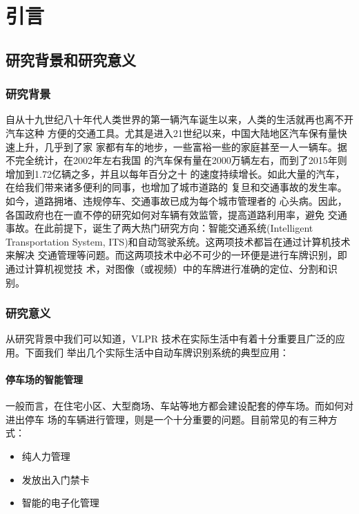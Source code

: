 \chapter{引言}
\section{研究背景和研究意义}
\subsection{研究背景}

自从十九世纪八十年代人类世界的第一辆汽车诞生以来，人类的生活就再也离不开汽车这种
方便的交通工具。尤其是进入21世纪以来，中国大陆地区汽车保有量快速上升，几乎到了家
家都有车的地步，一些富裕一些的家庭甚至一人一辆车。据不完全统计，在2002年左右我国
的汽车保有量在2000万辆左右，而到了2015年则增加到1.72亿辆之多，并且以每年百分之十
的速度持续增长。如此大量的汽车，在给我们带来诸多便利的同事，也增加了城市道路的
复旦和交通事故的发生率。如今，道路拥堵、违规停车、交通事故已成为每个城市管理者的
心头病。因此，各国政府也在一直不停的研究如何对车辆有效监管，提高道路利用率，避免
交通事故。在此前提下，诞生了两大热门研究方向：智能交通系统(Intelligent
Transportation System, ITS)和自动驾驶系统。这两项技术都旨在通过计算机技术来解决
交通管理等问题。而这两项技术中必不可少的一环便是进行车牌识别，即通过计算机视觉技
术，对图像（或视频）中的车牌进行准确的定位、分割和识别。

\subsection{研究意义}

从研究背景中我们可以知道，VLPR 技术在实际生活中有着十分重要且广泛的应用。下面我们
举出几个实际生活中自动车牌识别系统的典型应用：

\subsubsection{停车场的智能管理}

一般而言，在住宅小区、大型商场、车站等地方都会建设配套的停车场。而如何对进出停车
场的车辆进行管理，则是一个十分重要的问题。目前常见的有三种方式：

\begin{itemize}
\item 纯人力管理
\item 发放出入门禁卡
\item 智能的电子化管理
\end{itemize}

